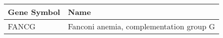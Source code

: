 \begin{tabular}{ll}
\toprule
Gene Symbol &                                    Name \\
\midrule
      FANCG & Fanconi anemia, complementation group G \\
\bottomrule
\end{tabular}
